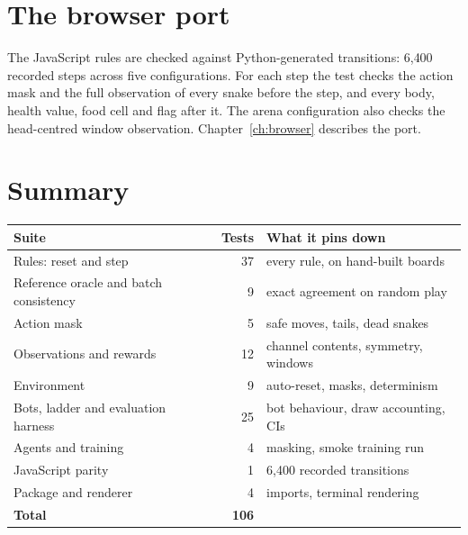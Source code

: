 \section{The browser port}

The JavaScript rules are checked against Python-generated transitions: 6{,}400
recorded steps across five configurations. For each step the test checks the action mask
and the full observation of every snake before the step, and every body, health value,
food cell and flag after it. The arena configuration also checks the head-centred
window observation. Chapter~\ref{ch:browser} describes the port.

\section{Summary}

\begin{center}
\begin{tabular}{@{}lrl@{}}
\toprule
\textbf{Suite} & \textbf{Tests} & \textbf{What it pins down}\\
\midrule
Rules: reset and step & 37 & every rule, on hand-built boards\\
Reference oracle and batch consistency & 9 & exact agreement on random play\\
Action mask & 5 & safe moves, tails, dead snakes\\
Observations and rewards & 12 & channel contents, symmetry, windows\\
Environment & 9 & auto-reset, masks, determinism\\
Bots, ladder and evaluation harness & 25 & bot behaviour, draw accounting, CIs\\
Agents and training & 4 & masking, smoke training run\\
JavaScript parity & 1 & 6{,}400 recorded transitions\\
Package and renderer & 4 & imports, terminal rendering\\
\midrule
\textbf{Total} & \textbf{106} & \\
\bottomrule
\end{tabular}
\end{center}
